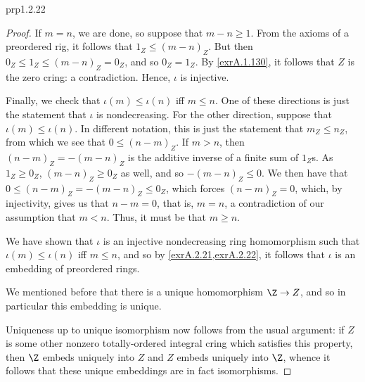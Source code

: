 \begin{thm}{}{prp1.2.22}
\begin{proof}
If $m=n$, we are done, so suppose that $m-n\geq 1$.  From the axioms of a preordered rig, it follows that $1_Z\leq (m-n)_Z$.  But then $0_Z\leq 1_Z\leq (m-n)_Z=0_Z$, and so $0_Z=1_Z$.  By \cref{exrA.1.130}, it follows that $Z$ is the zero cring:  a contradiction.  Hence, $\iota$ is injective.

Finally, we check that $\iota (m)\leq \iota (n)$ iff $m\leq n$.  One of these directions is just the statement that $\iota$ is nondecreasing.  For the other direction, suppose that $\iota (m)\leq \iota (n)$.  In different notation, this is just the statement that $m_Z\leq n_Z$, from which we see that $0\leq (n-m)_Z$.  If $m>n$, then $(n-m)_Z=-(m-n)_Z$ is the additive inverse of a finite sum of $1_Z$s.  As $1_Z\geq 0_Z$, $(m-n)_Z\geq 0_Z$ as well, and so $-(m-n)_Z\leq 0$.  We then have that $0\leq (n-m)_Z=-(m-n)_Z\leq 0_Z$, which forces $(n-m)_Z=0$, which, by injectivity, gives us that $n-m=0$, that is, $m=n$, a contradiction of our assumption that $m<n$.  Thus, it must be that $m\geq n$.

We have shown that $\iota$ is an injective nondecreasing ring homomorphism such that $\iota (m)\leq \iota (n)$ iff $m\leq n$, and so by \cref{exrA.2.21,exrA.2.22}, it follows that $\iota$ is an embedding of preordered rings.

We mentioned before that there is a unique homomorphism $\Z \rightarrow Z$, and so in particular this embedding is unique.

Uniqueness up to unique isomorphism now follows from the usual argument:  if $Z$ is some other nonzero totally-ordered integral cring which satisfies this property, then $\Z$ embeds uniquely into $Z$ and $Z$ embeds uniquely into $\Z$, whence it follows that these unique embeddings are in fact isomorphisms.
\end{proof}
\end{thm}

